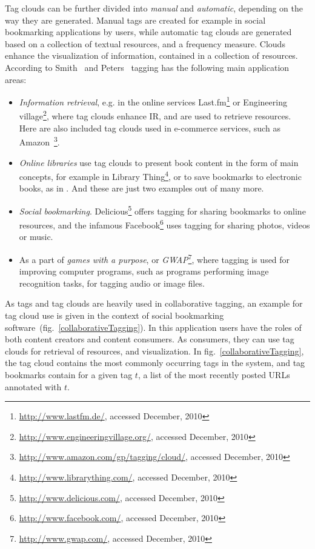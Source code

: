 Tag clouds can be further divided into \textit{manual} and \textit{automatic}, depending on the way they are generated. Manual tags are created for example in social bookmarking applications by users, while automatic tag clouds are generated based on a collection of textual resources, and a frequency measure. Clouds enhance the visualization of information, contained in a collection of resources. According to Smith~\cite{tagging2008} and Peters~\cite{folksonomiesWeb2.0_2009} tagging has the following main application areas: \\
\begin{itemize}
\item \textit{Information retrieval}, e.g. in the online services Last.fm\footnote{\url{http://www.lastfm.de/}, accessed December, 2010} or Engineering village\footnote{\url{http://www.engineeringvillage.org/}, accessed December, 2010}, where tag clouds enhance \gls{IR}, and are used to retrieve resources. Here are also included tag clouds used in e-commerce services, such as Amazon~\footnote{\url{http://www.amazon.com/gp/tagging/cloud/}, accessed December, 2010}.

\item \textit{Online libraries} use tag clouds to present book content in the form of main concepts, for example in Library Thing\footnote{\url{http://www.librarything.com/}, accessed December, 2010}, or to save bookmarks to electronic books, as in  . And these are just two examples out of many more. \\

\item \textit{Social bookmarking}. Delicious\footnote{\url{http://www.delicious.com/}, accessed December, 2010} offers tagging for sharing bookmarks to online resources, and the infamous Facebook\footnote{\url{http://www.facebook.com/}, accessed December, 2010}  uses tagging for sharing photos, videos or music. \\

\item As a part of \textit{games with a purpose}, or \textit{GWAP}\footnote{\url{http://www.gwap.com/}, accessed December, 2010}, where tagging is used for improving computer programs, such as programs performing image recognition tasks, for tagging audio or image files. \\ 
\end{itemize}

As tags and tag clouds are heavily used in collaborative tagging, an example for tag cloud use is given in the context of social bookmarking software~(fig.~\ref{collaborativeTagging}). In this application users have the roles of both content creators and content consumers. As consumers, they can use tag clouds for retrieval of resources, and visualization. In fig.~\ref{collaborativeTagging}, the tag cloud contains the most commonly occurring tags in the system, and tag bookmarks contain for a given tag $t$, a list of the most recently posted URLs annotated with $t$.  \\  

